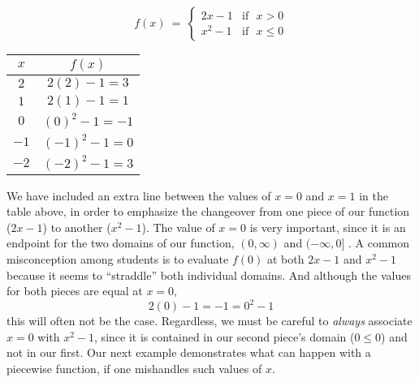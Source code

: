 \begin{example} 
~
\begin{center}
\[ f(x)~=~
	\begin{cases} 
      2x-1 & \text{if~~} x> 0\\
			x^2-1 & \text{if~~} x\leq 0
  \end{cases}
\]
\begin{tabular}{c|c}
	$x$ & $f(x)$\\
	\hline
	$2$ & $2(2)-1=3$\\
	\hline
	$1$ & $2(1)-1=1$\\
	\hline \hline
	$0$ & $(0)^2-1=-1$\\
	\hline
	$-1$ & $(-1)^2-1=0$\\
	\hline
	$-2$ & $(-2)^2-1=3$
\end{tabular}
\end{center}
\end{example}
We have included an extra line between the values of $x=0$ and $x=1$ in the table above, in order to emphasize the changeover from one piece of our function ($2x-1$) to another ($x^2-1$).  The value of $x=0$ is very important, since it is an endpoint for the two domains of our function,  $(0,\infty)$ and $(-\infty,0]$ .  A common misconception among students is to evaluate $f(0)$ at both $2x-1$ and $x^2-1$ because it seems to ``straddle'' both individual domains.  And although the values for both pieces are equal at $x=0$,
$$2(0)-1=-1=0^2-1$$ this will often not be the case.  Regardless, we must be careful to \textit{always} associate $x=0$ with $x^2-1$, since it is contained in our second piece's domain ($0\leq 0$) and not in our first.  Our next example demonstrates what can happen with a piecewise function, if one mishandles such values of $x$.

